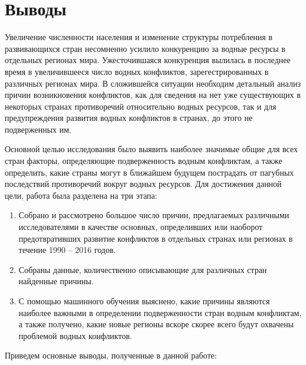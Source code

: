 \documentclass[a4paper, 12pt]{article}
\theoremstyle{plain} %
\theoremstyle{definition} %
\theoremstyle{remark} %
\begin{document}
\section{Выводы}
Увеличение численности населения и изменение структуры потребления в развивающихся стран несомненно усилило конкуренцию за водные ресурсы в отдельных регионах мира. Ужесточившаяся конкуренция вылилась в последнее время в увеличившееся число водных конфликтов, зарегестрированных в различных регионах мира. В сложившейся ситуации необходим детальный анализ причин возникновения конфликтов, как для сведения на нет уже существующих в некоторых странах противоречий относительно водных ресурсов, так и для предупреждения развития водных конфликтов в странах, до этого не подверженных им.


Основной целью исследования было выявить наиболее значимые общие для всех стран факторы, определяющие подверженность водным конфликтам, а также определить, какие страны могут в ближайшем будущем пострадать от пагубных последствий противоречий вокруг водных ресурсов. Для достижения данной цели, работа была разделена на три этапа:
\begin{enumerate}
	\item Собрано и рассмотрено большое число причин, предлагаемых различными исследователями в качестве основных, определивших или наоборот предотвративших развитие конфликтов в отдельных странах или регионах в течение 1990 – 2016 годов.
	\item Собраны данные, количественно описывающие для различных стран найденные причины.
	\item С помощью машинного обучения выяснено, какие причины являются наиболее важными в определении подверженности стран водным конфликтам, а также получено, какие новые регионы вскоре скорее всего будут охвачены проблемой водных конфликтов.
\end{enumerate}
Приведем основные выводы, полученные в данной работе:
\end{document}

